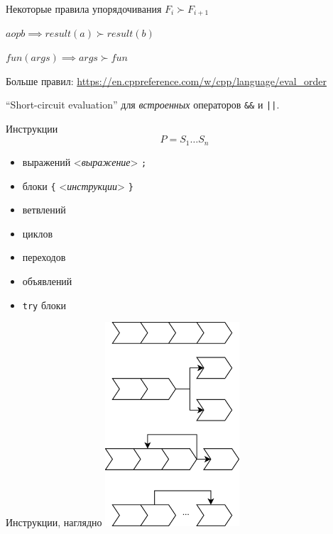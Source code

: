 \documentclass[unknownkeysallowed,xcolor=table]{beamer}
\begin{document}
\begin{frame}{Некоторые правила упорядочивания}
    $F_i \succ F_{i+1}$

    \vspace{1em}

    $a op b \implies result(a) \succ result(b)$

    \vspace{1em}

    $fun(args) \implies args \succ fun$

    \vspace{1em}

    Больше правил: \url{https://en.cppreference.com/w/cpp/language/eval_order}

    \vspace{1em}

    ``Short-circuit evaluation'' для \emph{встроенных} операторов \lstinline{&&} и \lstinline{||}.
\end{frame}

\begin{frame}[fragile]{Инструкции}
  \[
    P = S_1 \dotso S_n
  \]
  \begin{itemize}
    \item выражений <\emph{выражение}> \lstinline{;}
    \item блоки \lstinline|{| <\emph{инструкции}> \lstinline|}|
    \item ветвлений
    \item циклов
    \item переходов
    \item объявлений
    \item \lstinline{try} блоки
  \end{itemize}
\end{frame}

\begin{frame}{Инструкции, наглядно}
  \hspace*{3cm}\includegraphics[align=c,width=5cm,keepaspectratio]{images/control.png}
\end{frame}
\end{document}
